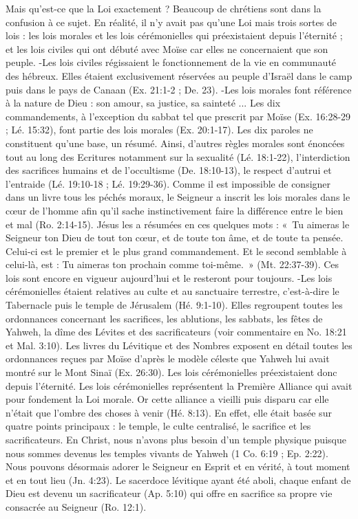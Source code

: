 \begin{multicols}{2}
{Mais qu’est-ce que la Loi exactement ?  Beaucoup de chrétiens sont dans la confusion à ce sujet.  En réalité, il n’y avait pas qu’une Loi mais trois sortes de lois : les  lois  morales et les lois cérémonielles  qui préexistaient depuis l’éternité ; et les lois civiles qui ont débuté avec Moïse car elles ne concernaient que son peuple.
-Les lois civiles régissaient le fonctionnement de la vie en communauté des hébreux. Elles étaient exclusivement réservées au peuple d’Israël dans le camp puis dans le pays de Canaan (Ex. 21:1-2 ; De. 23).
-Les lois morales font référence à la nature de Dieu : son amour, sa justice, sa sainteté ... Les dix commandements, à l’exception du sabbat tel que prescrit par Moïse (Ex. 16:28-29 ; Lé. 15:32), font partie des lois morales (Ex. 20:1-17). Les dix paroles ne constituent qu’une base, un résumé. Ainsi, d’autres règles morales sont énoncées tout au long des Ecritures notamment sur la sexualité (Lé. 18:1-22), l'interdiction des sacrifices humains et de l’occultisme (De. 18:10-13), le respect d’autrui et l’entraide (Lé. 19:10-18 ; Lé. 19:29-36). Comme il est impossible de consigner dans un livre tous les péchés moraux, le Seigneur a inscrit les lois morales dans le cœur de l’homme afin qu’il sache instinctivement faire la différence entre le bien et mal (Ro. 2:14-15). Jésus les a résumées en ces quelques mots : «~Tu aimeras le Seigneur ton Dieu de tout ton cœur, et de toute ton âme, et de toute ta pensée. Celui-ci est le premier et le plus grand commandement. Et le second semblable à celui-là, est : Tu aimeras ton prochain comme toi-même.~» (Mt. 22:37-39). Ces lois sont encore en vigueur aujourd’hui et le resteront pour toujours.
-Les lois cérémonielles étaient relatives au culte  et au sanctuaire terrestre, c’est-à-dire le Tabernacle puis le temple de Jérusalem (Hé. 9:1-10). Elles regroupent toutes les ordonnances concernant les sacrifices, les ablutions, les sabbats, les fêtes de Yahweh, la dîme des Lévites et des sacrificateurs (voir commentaire en No. 18:21 et Mal. 3:10). Les livres du Lévitique et des Nombres exposent en détail toutes les ordonnances reçues par Moïse d’après le modèle céleste que Yahweh lui avait montré  sur le Mont Sinaï (Ex. 26:30). Les lois cérémonielles préexistaient donc depuis l’éternité.
Les lois cérémonielles représentent la Première Alliance qui avait pour fondement la Loi morale. Or cette alliance a vieilli puis disparu car elle n’était que l’ombre des choses à venir (Hé. 8:13). En effet, elle était basée sur quatre points principaux : le temple, le culte centralisé, le sacrifice et les sacrificateurs. En Christ, nous n’avons plus besoin d’un temple physique puisque nous sommes devenus les temples vivants  de Yahweh (1 Co. 6:19 ; Ep. 2:22). Nous pouvons désormais adorer le Seigneur en Esprit et en vérité, à tout moment et en tout lieu (Jn. 4:23). Le sacerdoce lévitique ayant été aboli, chaque enfant de Dieu est devenu un sacrificateur (Ap. 5:10) qui offre en sacrifice sa propre vie consacrée au Seigneur (Ro. 12:1).
}
\end{multicols}
